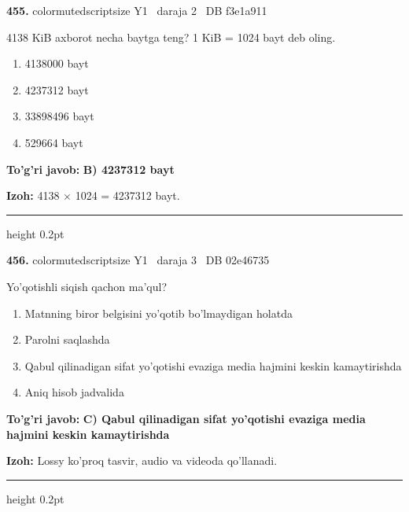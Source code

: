 \documentclass[10pt,a4paper,oneside]{article}
\begin{document}
\noindent\textbf{\color{ink}455.}  {color{muted}scriptsize Y1 \textbullet\ daraja 2 \textbullet\ DB f3e1a911}
\par
4138 KiB axborot necha baytga teng? 1 KiB = 1024 bayt deb oling.
\begin{enumerate}[label=\Alph*),leftmargin=9mm]
\item 4138000 bayt
\item 4237312 bayt
\item 33898496 bayt
\item 529664 bayt
\end{enumerate}
\begin{tcolorbox}[enhanced,breakable,colback=teal!4,colframe=teal!50!black,boxrule=0.5pt,arc=1.1mm,left=3mm,right=3mm,top=1.7mm,bottom=1.7mm,before skip=2mm,after skip=2mm]
\textbf{\color{teal}To'g'ri javob:} \textbf{B) 4237312 bayt}
\par\smallskip
\textbf{Izoh:} 4138 \ensuremath{\times} 1024 = 4237312 bayt.
\end{tcolorbox}
\vspace{2mm}\hrule height 0.2pt \vspace{3mm}

\noindent\textbf{\color{ink}456.}  {color{muted}scriptsize Y1 \textbullet\ daraja 3 \textbullet\ DB 02e46735}
\par
Yo'qotishli siqish qachon ma'qul?
\begin{enumerate}[label=\Alph*),leftmargin=9mm]
\item Matnning biror belgisini yo'qotib bo'lmaydigan holatda
\item Parolni saqlashda
\item Qabul qilinadigan sifat yo'qotishi evaziga media hajmini keskin kamaytirishda
\item Aniq hisob jadvalida
\end{enumerate}
\begin{tcolorbox}[enhanced,breakable,colback=teal!4,colframe=teal!50!black,boxrule=0.5pt,arc=1.1mm,left=3mm,right=3mm,top=1.7mm,bottom=1.7mm,before skip=2mm,after skip=2mm]
\textbf{\color{teal}To'g'ri javob:} \textbf{C) Qabul qilinadigan sifat yo'qotishi evaziga media hajmini keskin kamaytirishda}
\par\smallskip
\textbf{Izoh:} Lossy ko'proq tasvir, audio va videoda qo'llanadi.
\end{tcolorbox}
\vspace{2mm}\hrule height 0.2pt \vspace{3mm}
\end{document}
